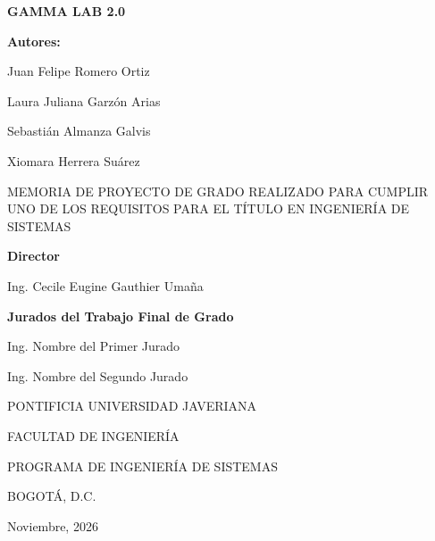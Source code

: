 \documentclass[12pt,letterpaper,oneside]{article}
\newcommand{\tituloProyecto}{GAMMA LAB 2.0}
\newcommand{\autorUno}{Juan Felipe Romero Ortiz}
\newcommand{\autorDos}{Laura Juliana Garzón Arias}
\newcommand{\autorTres}{Sebastián Almanza Galvis}
\newcommand{\autorCuatro}{Xiomara Herrera Suárez}
\newcommand{\leyendaGrado}{MEMORIA DE PROYECTO DE GRADO REALIZADO PARA CUMPLIR UNO DE
LOS REQUISITOS PARA EL TÍTULO EN INGENIERÍA DE SISTEMAS}
\newcommand{\director}{Ing. Cecile Eugine Gauthier Umaña}
\newcommand{\juradoUno}{Ing. Nombre del Primer Jurado}
\newcommand{\juradoDos}{Ing. Nombre del Segundo Jurado}
\newcommand{\universidad}{PONTIFICIA UNIVERSIDAD JAVERIANA}
\newcommand{\facultad}{FACULTAD DE INGENIERÍA}
\newcommand{\programa}{PROGRAMA DE INGENIERÍA DE SISTEMAS}
\newcommand{\ciudad}{BOGOTÁ, D.C.}
\newcommand{\fechaLarga}{Noviembre, 2026}      %
\begin{document}
\begin{center}
  {\Large\bfseries \tituloProyecto}\par
  \vspace{1.4cm}

  {\bfseries Autores:}\par
  \vspace{0.5cm}
  \autorUno\par
  \autorDos\par
  \autorTres\par
  \autorCuatro\par
  \vspace{1.4cm}

  \leyendaGrado\par
  \vspace{1.4cm}

  {\bfseries Director}\par
  \vspace{0.4cm}
  \director\par
  \vspace{1.2cm}

  {\bfseries Jurados del Trabajo Final de Grado}\par
  \vspace{0.4cm}
  \juradoUno\par
  \juradoDos\par
  \vspace{1.8cm}

  \universidad\par\vspace{0.6cm}
  \facultad\par\vspace{0.6cm}
  \programa\par\vspace{0.6cm}
  \ciudad\par\vspace{0.6cm}
  \fechaLarga\par
\end{center}
\clearpage
\end{document}
